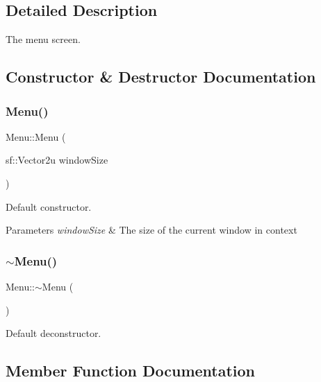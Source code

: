 \subsection{Detailed Description}
The menu screen. 

\subsection{Constructor \& Destructor Documentation}
\mbox{\label{class_menu_aea3a4bfcab09d8220876bf91123fd154}} 
\subsubsection{\texorpdfstring{Menu()}{Menu()}}
{\footnotesize\ttfamily Menu\+::\+Menu (\begin{DoxyParamCaption}\item[{sf\+::\+Vector2u}]{window\+Size }\end{DoxyParamCaption})}



Default constructor. 


\begin{DoxyParams}{Parameters}
{\em window\+Size} & The size of the current window in context \\
\hline
\end{DoxyParams}
\mbox{\label{class_menu_a831387f51358cfb88cd018e1777bc980}} 
\subsubsection{\texorpdfstring{$\sim$\+Menu()}{~Menu()}}
{\footnotesize\ttfamily Menu\+::$\sim$\+Menu (\begin{DoxyParamCaption}{ }\end{DoxyParamCaption})}



Default deconstructor. 



\subsection{Member Function Documentation}
\mbox{\label{class_menu_a199db779b92cfd8eeedbf504ef554fc5}} 
